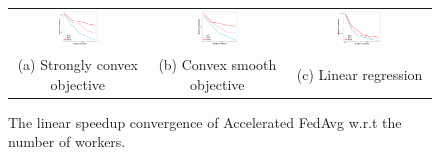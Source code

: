 \begin{figure}
\centering
\begin{tabular}{ccc}
\includegraphics[width=0.33\textwidth]{fig/paper-nesterovspeedupNodesT-min-w8a-epsilon0131-reg1e-05.pdf} & 
\includegraphics[width=0.33\textwidth]{fig/paper-nesterovspeedupNodesT-min-w8a-epsilon0134-reg0.pdf}
& 
\includegraphics[width=0.33\textwidth]{fig/paper-lrnesterovspeedupNodesT-min-linearregressionw8a-epsilon002-reg0.pdf}\\
(a) Strongly convex objective & (b) Convex smooth objective & (c) Linear regression
	\end{tabular}
\caption{The linear speedup convergence of Accelerated FedAvg w.r.t the number of workers. }
\label{fig:nesterov}
\end{figure}


